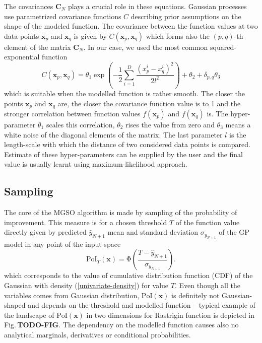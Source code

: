 \documentclass{itatnew}
\newcommand{\xx}{\mathrm{\mathbf{x}}}
\newcommand{\CC}{\mathrm{\mathbf{C}}}
\begin{document}
The covariances $\CC_N$ plays a crucial role in these equations. Gaussian processes use parametrized covariance functions $C$ describing prior assumptions on the shape of the modeled function. The covariance between the function values at two data points $\xx_p$ and $\xx_q$ is given by $C(\xx_p, \xx_q)$ which forms also the $(p,q)$-th element of the matrix $\CC_N$. In our case, we used the most common squared-exponential function
\begin{equation}
C(\xx_p, \xx_q) = \theta_1 \exp \left( -\frac{1}{2} \sum^D_{i=1} \frac{(x^i_p - x^i_q)^2} {2l^2} \right) + \theta_2 + \delta_{p,q}\theta_3
\end{equation}
which is suitable when the modelled function is rather smooth. The closer the points $\xx_p$ and $\xx_q$ are, the closer the covariance function value is to 1 and the stronger correlation between function values $f(\xx_p)$ and $f(\xx_q)$ is. The hyper-parameter $\theta_1$ scales this correlation, $\theta_2$ rises the value from zero and $\theta_3$ means a white noise of the diagonal elements of the matrix. The last parameter $l$ is the length-scale with which the distance of two considered data points is compared. Estimate of these hyper-parameters can be supplied by the user and the final value is usually learnt using maximum-likelihood approach.


\subsection{Sampling}

The core of the MGSO algorithm is made by sampling of the probability of improvement. This measure is for a chosen threshold $T$ of the function value directly given by predicted $\hat{y}_{N+1}$ mean and standard deviation $\sigma_{y_{N+1}}$ of the GP model in any point of the input space
\begin{equation}
  \mathrm{PoI}_T(\xx) = \mathrm{\Phi}\left( \frac{T - \hat{y}_{N+1}}{\sigma_{y_{N+1}}} \right).
\end{equation}
which corresponds to the value of cumulative distribution function (CDF) of the Gaussian with density (\ref{univariate-density}) for value $T$. Even though all the variables comes from Gaussian distribution, $\mathrm{PoI}(\xx)$ is definitely not Gaussian-shaped and depends on the threshold and modelled function -- typical example of the landscape of $\textrm{PoI}(\xx)$ in two dimensions for Rastrigin function is depicted in Fig.\,\textbf{TODO-FIG}. The dependency on the modelled function causes also no analytical marginals, derivatives or conditional probabilities.
\end{document}
